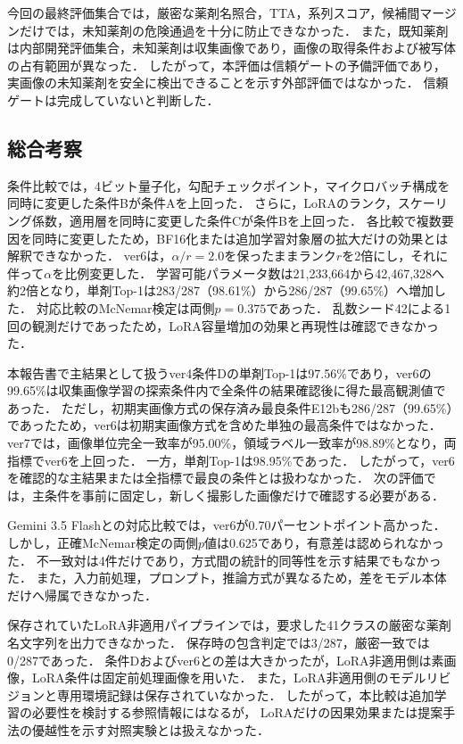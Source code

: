 \documentclass[uplatex,dvipdfmx]{jsarticle}
\begin{document}
今回の最終評価集合では，厳密な薬剤名照合，TTA，系列スコア，候補間マージンだけでは，未知薬剤の危険通過を十分に防止できなかった．
また，既知薬剤は内部開発評価集合，未知薬剤は収集画像であり，画像の取得条件および被写体の占有範囲が異なった．
したがって，本評価は信頼ゲートの予備評価であり，実画像の未知薬剤を安全に検出できることを示す外部評価ではなかった．
信頼ゲートは完成していないと判断した．

\subsection{総合考察}

条件比較では，4ビット量子化，勾配チェックポイント，マイクロバッチ構成を同時に変更した条件Bが条件Aを上回った．
さらに，LoRAのランク，スケーリング係数，適用層を同時に変更した条件Cが条件Bを上回った．
各比較で複数要因を同時に変更したため，BF16化または追加学習対象層の拡大だけの効果とは解釈できなかった．
ver6は，$\alpha/r=2.0$を保ったままランク$r$を2倍にし，それに伴って$\alpha$を比例変更した．
学習可能パラメータ数は21,233,664から42,467,328へ約2倍となり，単剤Top-1は283/287（98.61\%）から286/287（99.65\%）へ増加した．
対応比較のMcNemar検定は両側$p=0.375$であった．
乱数シード42による1回の観測だけであったため，LoRA容量増加の効果と再現性は確認できなかった．

本報告書で主結果として扱うver4条件Dの単剤Top-1は97.56\%であり，ver6の99.65\%は収集画像学習の探索条件内で全条件の結果確認後に得た最高観測値であった．
ただし，初期実画像方式の保存済み最良条件E12bも286/287（99.65\%）であったため，ver6は初期実画像方式を含めた単独の最高条件ではなかった．
ver7では，画像単位完全一致率が95.00\%，領域ラベル一致率が98.89\%となり，両指標でver6を上回った．
一方，単剤Top-1は98.95\%であった．
したがって，ver6を確認的な主結果または全指標で最良の条件とは扱わなかった．
次の評価では，主条件を事前に固定し，新しく撮影した画像だけで確認する必要がある．

Gemini 3.5 Flashとの対応比較では，ver6が0.70パーセントポイント高かった．
しかし，正確McNemar検定の両側$p$値は0.625であり，有意差は認められなかった．
不一致対は4件だけであり，方式間の統計的同等性を示す結果でもなかった．
また，入力前処理，プロンプト，推論方式が異なるため，差をモデル本体だけへ帰属できなかった．

保存されていたLoRA非適用パイプラインでは，要求した41クラスの厳密な薬剤名文字列を出力できなかった．
保存時の包含判定では3/287，厳密一致では0/287であった．
条件Dおよびver6との差は大きかったが，LoRA非適用側は素画像，LoRA条件は固定前処理画像を用いた．
また，LoRA非適用側のモデルリビジョンと専用環境記録は保存されていなかった．
したがって，本比較は追加学習の必要性を検討する参照情報にはなるが，
LoRAだけの因果効果または提案手法の優越性を示す対照実験とは扱えなかった．
\end{document}
